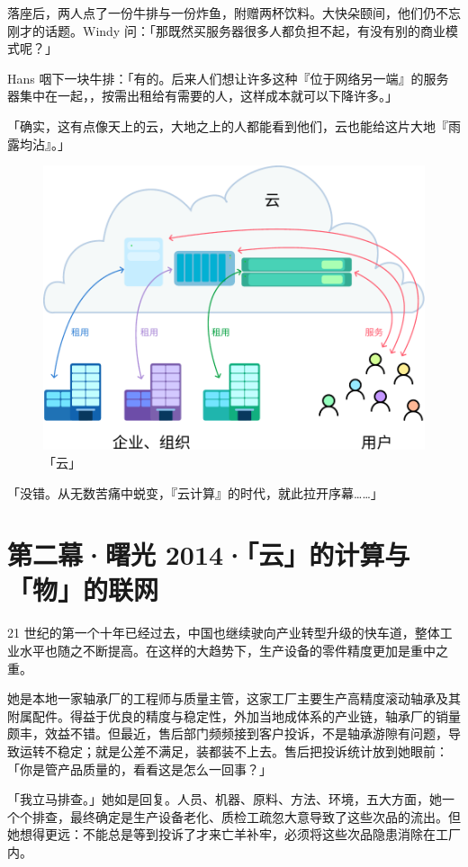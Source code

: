 落座后，两人点了一份牛排与一份炸鱼，附赠两杯饮料。大快朵颐间，他们仍不忘刚才的话题。Windy 问：「那既然买服务器很多人都负担不起，有没有别的商业模式呢？」

Hans 咽下一块牛排：「有的。后来人们想让许多这种『位于网络另一端』的服务器集中在一起，，按需出租给有需要的人，这样成本就可以下降许多。」

「确实，这有点像天上的云，大地之上的人都能看到他们，云也能给这片大地『雨露均沾』。」

\begin{figure}[htb!]
  \centering
  \includegraphics[width=.85\textwidth]{assets/surpass/The_Cloud.pdf}
  \caption{「云」}
  \label{fig:The_Cloud}
\end{figure}

「没错。从无数苦痛中蜕变，『云计算』的时代，就此拉开序幕……」

\section{第二幕·曙光 2014·「云」的计算与「物」的联网}

21 世纪的第一个十年已经过去，中国也继续驶向产业转型升级的快车道，整体工业水平也随之不断提高。在这样的大趋势下，生产设备的零件精度更加是重中之重。

她是本地一家轴承厂的工程师与质量主管，这家工厂主要生产高精度滚动轴承及其附属配件。得益于优良的精度与稳定性，外加当地成体系的产业链，轴承厂的销量颇丰，效益不错。但最近，售后部门频频接到客户投诉，不是轴承游隙有问题，导致运转不稳定；就是公差不满足，装都装不上去。售后把投诉统计放到她眼前：「你是管产品质量的，看看这是怎么一回事？」

「我立马排查。」她如是回复。人员、机器、原料、方法、环境，五大方面，她一个个排查，最终确定是生产设备老化、质检工疏忽大意导致了这些次品的流出。但她想得更远：不能总是等到投诉了才来亡羊补牢，必须将这些次品隐患消除在工厂内。

